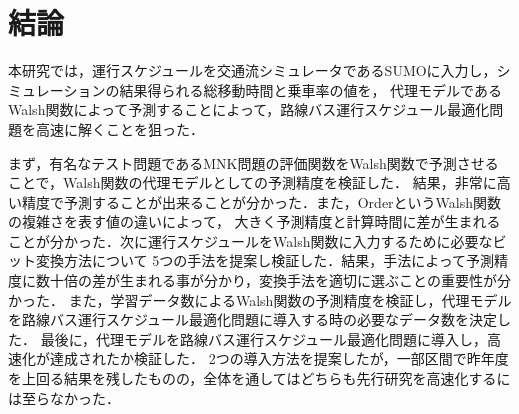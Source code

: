 \documentclass[main]{subfiles}
\begin{document}
\chapter{結論}
本研究では，運行スケジュールを交通流シミュレータであるSUMOに入力し，シミュレーションの結果得られる総移動時間と乗車率の値を，
代理モデルであるWalsh関数によって予測することによって，路線バス運行スケジュール最適化問題を高速に解くことを狙った．

まず，有名なテスト問題であるMNK問題の評価関数をWalsh関数で予測させることで，Walsh関数の代理モデルとしての予測精度を検証した．
結果，非常に高い精度で予測することが出来ることが分かった．また，OrderというWalsh関数の複雑さを表す値の違いによって，
大きく予測精度と計算時間に差が生まれることが分かった．次に運行スケジュールをWalsh関数に入力するために必要なビット変換方法について
5つの手法を提案し検証した．結果，手法によって予測精度に数十倍の差が生まれる事が分かり，変換手法を適切に選ぶことの重要性が分かった．
また，学習データ数によるWalsh関数の予測精度を検証し，代理モデルを路線バス運行スケジュール最適化問題に導入する時の必要なデータ数を決定した．
最後に，代理モデルを路線バス運行スケジュール最適化問題に導入し，高速化が達成されたか検証した．
2つの導入方法を提案したが，一部区間で昨年度を上回る結果を残したものの，全体を通してはどちらも先行研究を高速化するには至らなかった．
\end{document}
